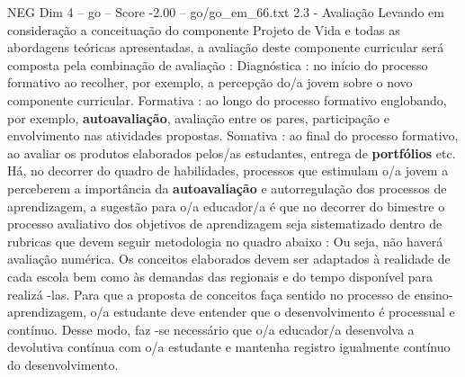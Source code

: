 \begin{textsample}{NEG Dim 4 – go – Score -2.00 – go/go\_em\_66.txt}  \label{ex:f4_neg_226}
2.3 - Avaliação Levando em consideração a conceituação do componente Projeto de Vida e todas as abordagens teóricas apresentadas, a avaliação deste componente curricular será composta pela combinação de avaliação : Diagnóstica : no início do processo formativo ao recolher, por exemplo, a percepção do/a jovem sobre o novo componente curricular.
Formativa : ao longo do processo formativo englobando, por exemplo, \textbf{autoavaliação}, avaliação entre os pares, participação e envolvimento nas atividades propostas.
Somativa : ao final do processo formativo, ao avaliar os produtos elaborados pelos/as estudantes, entrega de \textbf{portfólios} etc.
Há, no decorrer do quadro de habilidades, processos que estimulam o/a jovem a perceberem a importância da \textbf{autoavaliação} e autorregulação dos processos de aprendizagem, a sugestão para o/a educador/a é que no decorrer do bimestre o processo avaliativo dos objetivos de aprendizagem seja sistematizado dentro de rubricas que devem seguir metodologia no quadro abaixo : Ou seja, não haverá avaliação numérica.
Os conceitos elaborados devem ser adaptados à realidade de cada escola bem como às demandas das regionais e do tempo disponível para realizá -las.
Para que a proposta de conceitos faça sentido no processo de ensino-aprendizagem, o/a estudante deve entender que o desenvolvimento é processual e contínuo.
Desse modo, faz -se necessário que o/a educador/a desenvolva a devolutiva contínua com o/a estudante e mantenha registro igualmente contínuo do desenvolvimento.

\end{textsample}
